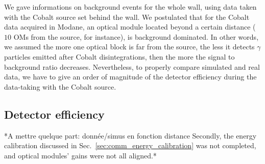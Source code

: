 We gave informations on background events for the whole wall, using data taken with the Cobalt source set behind the wall.
We postulated that for the Cobalt data acquired in Modane, an optical module located beyond a certain distance ($10$ OMs from the source, for instance), is background dominated.
In other words, we assumed the more one optical block is far from the source, the less it detects $\gamma$ particles emitted after Cobalt disintegrations, then the more the signal to background ratio decreases.
Nevertheless, to properly compare simulated and real data, we have to give an order of magnitude of the detector efficiency during the data-taking with the Cobalt source.





\subsection{Detector efficiency}
\label{subsec:detector_efficiency}

*A mettre quelque part:
donnée/simus en fonction distance
Secondly, the energy calibration discussed in Sec.~\ref{sec:comm_energy_calibration} was not completed, and optical modules' gains were not all aligned.*


